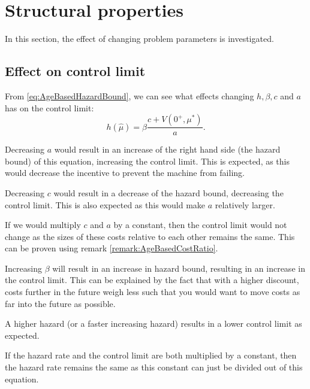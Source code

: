\section{Structural properties}\label{section:AgeBasedStructuralProperties}
In this section, the effect of changing problem parameters is investigated.

\subsection{Effect on control limit}
From \eqref{eq:AgeBasedHazardBound}, we can see what effects changing $h,\beta,c$ and $a$ has on the control limit:
\[h(\hat{\mu})=\beta\frac{c+V(0^+,\mu^*)}{a}.\]
\begin{remark}
	Decreasing  $a$ would result in an increase of the right hand side (the hazard bound) of this equation, increasing the control limit.
	This is expected, as this would decrease the incentive to prevent the machine from failing.
\end{remark}
\begin{remark}
	Decreasing $c$ would result in a decrease of the hazard bound, decreasing the control limit.
	This is also expected as this would make $a$ relatively larger.
\end{remark}
\begin{remark}
	If we would multiply $c$ and $a$ by a constant, then the control limit would not change as the sizes of these costs relative to each other remains the same.
	This can be proven using remark \ref{remark:AgeBasedCostRatio}.
\end{remark}
\begin{remark}\label{remark:AgeBasedControlLimitDiscountIncrease}
	Increasing $\beta$ will result in an increase in hazard bound, resulting in an increase in the control limit.
	This can be explained by the fact that with a higher discount, costs further in the future weigh less such that you would want to move costs as far into the future as possible.
\end{remark}
\begin{remark}
	A higher hazard (or a faster increasing hazard) results in a lower control limit as expected.
\end{remark}
\begin{remark}\label{remark:AgeBasedControlLimitDiscountAndHazardIncrease}
	If the hazard rate and the control limit are both multiplied by a constant, then the hazard rate remains the same as this constant can just be divided out of this equation.
\end{remark}

